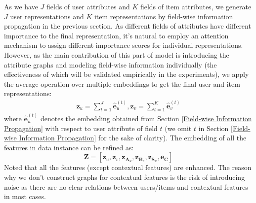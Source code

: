 As we have $J$ fields of user attributes and $K$ fields of item attributes, we generate $J$ user representations and $K$ item representations by field-wise information propagation in the previous section.
As different fields of attributes have different importance to the final representation, it's natural to employ an attention mechanism to assign different importance scores for individual representations.
However, as the main contribution of this part of model is introducing the attribute graphs and modeling field-wise information individually (the effectiveness of which will be validated empirically in the experiments), we apply the average operation over multiple embeddings to get the final user and item representations:
\begin{align}
\textbf{z}_u = \sum_{t=1}^{J}\hat{\textbf{e}}_u^{(t)},  
\textbf{z}_v = \sum_{t=1}^{K}\hat{\textbf{e}}_v^{(t)}
\end{align}
where $\hat{\textbf{e}}_u^{(t)}$ denotes the embedding obtained from Section \ref{Field-wise Information Propagation} with respect to user attribute of field $t$ (we omit $t$ in Section \ref{Field-wise Information Propagation} for the sake of clarity).
The embedding of all the features in data instance can be refined as:
\begin{equation}
 \textbf{Z} = [\textbf{z}_u, \textbf{z}_v, \textbf{z}_{\textbf{A}_u}, \textbf{z}_{\textbf{B}_v}, \textbf{z}_{\textbf{S}_u}, \textbf{e}_{\textbf{C}}]
 \end{equation}
Noted that all the features (except contextual features) are enhanced.
The reason why we don't construct graphs for contextual features is the risk of introducing noise as there are no clear relations between users/items and contextual features in most cases.




